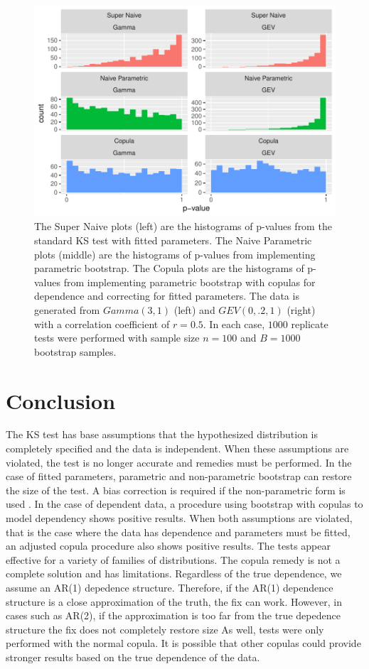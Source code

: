 \documentclass[12pt, letterpaper, titlepage]{article}
\begin{document}
\begin{figure}[tbp]
  \centering
  \includegraphics{hist_gamma_gev_FD}
  \caption{The Super Naive plots (left) are the histograms of p-values from the 
  standard KS test with fitted parameters. The Naive Parametric plots (middle) 
  are the histograms of p-values from implementing parametric bootstrap. The 
  Copula plots are the histograms of p-values from implementing parametric 
  bootstrap with copulas for dependence and correcting for fitted parameters. 
  The data is generated from $Gamma(3, 1)$ (left) and $GEV(0, .2, 1)$ (right) 
  with a correlation coefficient of $r = 0.5$. In each case, $1000$ replicate 
  tests were performed with sample size $n = 100$ and $B = 1000$ bootstrap 
  samples.}
  \label{fig:hist_gamma_gev_FD}
\end{figure}


\section{Conclusion}
\label{sec:conclusion}

The KS test has base assumptions that the hypothesized distribution is 
completely specified and the data is independent. When these assumptions are 
violated, the test is no longer accurate and remedies must be performed. In the 
case of fitted parameters, parametric and non-parametric bootstrap can restore 
the size of the test. A bias correction is required if the non-parametric form 
is used \citep{Babu}. In the case of dependent data, a procedure using bootstrap 
with copulas to model dependency shows positive results. When both assumptions 
are violated, that is the case where the data has dependence and parameters must 
be fitted, an adjusted copula procedure also shows positive results. The tests 
appear effective for a variety of families of distributions. The copula remedy 
is not a complete solution and has limitations. Regardless of the true 
dependence, we assume an AR(1) depedence structure. Therefore, if the AR(1) 
dependence structure is a close approximation of the truth, the fix can work. 
However, in cases such as AR(2), if the approximation is too far from the true 
depedence structure the fix does not completely restore size As well, tests 
were only performed with the normal copula. It is possible that other copulas
could provide stronger results based on the true dependence of the data.




\end{document}
